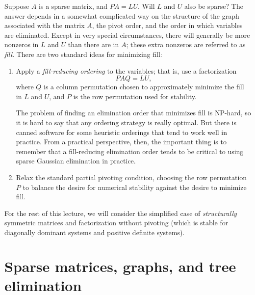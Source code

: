 \documentclass[12pt, leqno]{article}
\begin{document}
Suppose $A$ is a sparse matrix, and $PA = LU$.  Will $L$ and $U$ also
be sparse?  The answer depends in a somewhat complicated way on the
structure of the graph associated with the matrix $A$, the pivot
order, and the order in which variables are eliminated.  Except in
very special circumstances, there will generally be more nonzeros in
$L$ and $U$ than there are in $A$; these extra nonzeros are referred
to as {\em fill}.  There are two standard ideas for minimizing fill:
\begin{enumerate}
\item
  Apply a {\em fill-reducing ordering} to the variables; that is,
  use a factorization
  \[
    PAQ = LU,
  \]
  where $Q$ is a column permutation chosen to approximately minimize
  the fill in $L$ and $U$, and $P$ is the row permutation used for
  stability.

  The problem of finding an elimination order that minimizes fill is
  NP-hard, so it is hard to say that any ordering strategy is really
  optimal.  But there is canned software for some heuristic orderings
  that tend to work well in practice.  From a practical perspective,
  then, the important thing is to remember that a fill-reducing
  elimination order tends to be critical to using sparse Gaussian
  elimination in practice.
\item
  Relax the standard partial pivoting condition, choosing the row
  permutation $P$ to balance the desire for numerical stability
  against the desire to minimize fill.
\end{enumerate}

For the rest of this lecture, we will consider the simplified case of
{\em structurally} symmetric matrices and factorization without
pivoting (which is stable for diagonally dominant systems and positive
definite systems).

\section*{Sparse matrices, graphs, and tree elimination}
\end{document}
